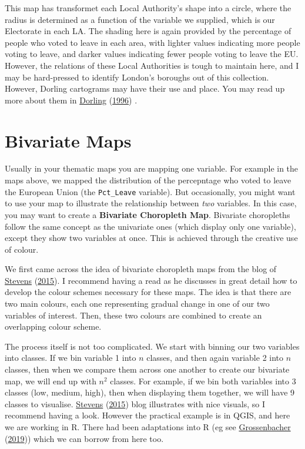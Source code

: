\documentclass[
  krantz2]{krantz}
\begin{document}
This map has transformet each Local Authority's shape into a circle, where the radius is determined as a function of the variable we supplied, which is our Electorate in each LA. The shading here is again provided by the percentage of people who voted to leave in each area, with lighter values indicating more people voting to leave, and darker values indicating fewer people voting to leave the EU. However, the relations of these Local Authorities is tough to maintain here, and I may be hard-pressed to identify London's boroughs out of this collection. However, Dorling cartograms may have their use and place. You may read up more about them in \protect\hyperlink{ref-Dorling_1996}{Dorling} (\protect\hyperlink{ref-Dorling_1996}{1996}) .

\hypertarget{bivariate-maps}{%
\section{Bivariate Maps}\label{bivariate-maps}}

Usually in your thematic maps you are mapping one variable. For example in the maps above, we mapped the distribution of the percepntage who voted to leave the European Union (the \texttt{Pct\_Leave} variable). But occasionally, you might want to use your map to illustrate the relationship between \emph{two} variables. In this case, you may want to create a \textbf{Bivariate Choropleth Map}. Bivariate choropleths follow the same concept as the univariate ones (which display only one variable), except they show two variables at once. This is achieved through the creative use of colour.

We first came across the idea of bivariate choropleth maps from the blog of \protect\hyperlink{ref-Stevens_2015}{Stevens} (\protect\hyperlink{ref-Stevens_2015}{2015}). I recommend having a read as he discusses in great detail how to develop the colour schemes necessary for these maps. The idea is that there are two main colours, each one representing gradual change in one of our two variables of interest. Then, these two colours are combined to create an overlapping colour scheme.

The process itself is not too complicated. We start with binning our two variables into classes. If we bin variable 1 into \(n\) classes, and then again variable 2 into \(n\) classes, then when we compare them across one another to create our bivariate map, we will end up with \(n^2\) classes. For example, if we bin both variables into 3 classes (low, medium, high), then when displaying them together, we will have 9 classes to visualise. \protect\hyperlink{ref-Stevens_2015}{Stevens} (\protect\hyperlink{ref-Stevens_2015}{2015}) blog illustrates with nice visuals, so I recommend having a look. However the practical example is in QGIS, and here we are working in R. There had been adaptations into R (eg see \protect\hyperlink{ref-Grossenbacher_2019}{Grossenbacher} (\protect\hyperlink{ref-Grossenbacher_2019}{2019})) which we can borrow from here too.
\end{document}
